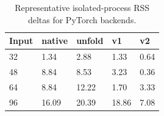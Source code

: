 \begin{table}[t]
\centering
\caption{Representative isolated-process RSS deltas for PyTorch backends.}
\label{tab:torch-memory}
\begin{tabular}{lllll}
\toprule
Input & native & unfold & v1 & v2 \\
\midrule
32 & 1.34 & 2.88 & 1.33 & 0.64 \\
48 & 8.84 & 8.53 & 3.23 & 0.36 \\
64 & 8.84 & 12.22 & 1.70 & 3.33 \\
96 & 16.09 & 20.39 & 18.86 & 7.08 \\
\bottomrule
\end{tabular}
\end{table}
